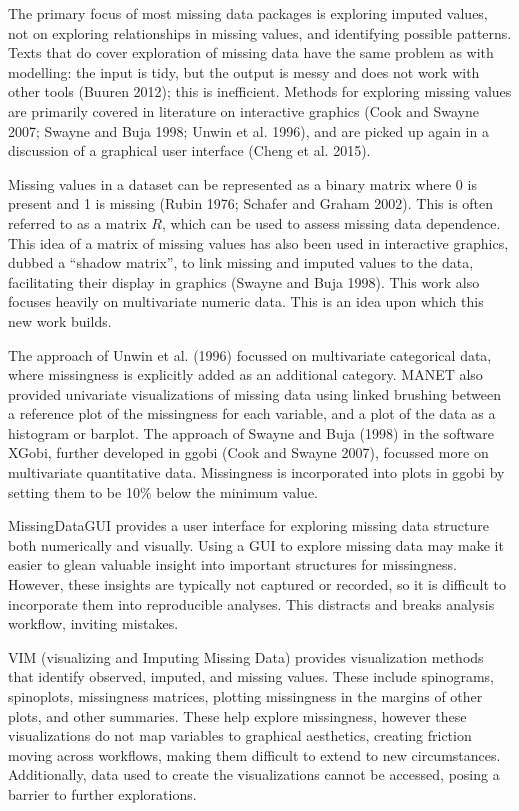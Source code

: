 \documentclass[]{article}
\theoremstyle{definition}
\theoremstyle{definition}
\theoremstyle{definition}
\theoremstyle{remark}
\begin{document}
The primary focus of most missing data packages is exploring imputed
values, not on exploring relationships in missing values, and
identifying possible patterns. Texts that do cover exploration of
missing data have the same problem as with modelling: the input is tidy,
but the output is messy and does not work with other tools (Buuren
2012); this is inefficient. Methods for exploring missing values are
primarily covered in literature on interactive graphics (Cook and Swayne
2007; Swayne and Buja 1998; Unwin et al. 1996), and are picked up again
in a discussion of a graphical user interface (Cheng et al. 2015).

Missing values in a dataset can be represented as a binary matrix where
0 is present and 1 is missing (Rubin 1976; Schafer and Graham 2002).
This is often referred to as a matrix \(R\), which can be used to assess
missing data dependence. This idea of a matrix of missing values has
also been used in interactive graphics, dubbed a ``shadow matrix'', to
link missing and imputed values to the data, facilitating their display
in graphics (Swayne and Buja 1998). This work also focuses heavily on
multivariate numeric data. This is an idea upon which this new work
builds.

The approach of Unwin et al. (1996) focussed on multivariate categorical
data, where missingness is explicitly added as an additional category.
MANET also provided univariate visualizations of missing data using
linked brushing between a reference plot of the missingness for each
variable, and a plot of the data as a histogram or barplot. The approach
of Swayne and Buja (1998) in the software XGobi, further developed in
ggobi (Cook and Swayne 2007), focussed more on multivariate quantitative
data. Missingness is incorporated into plots in ggobi by setting them to
be 10\% below the minimum value.

MissingDataGUI provides a user interface for exploring missing data
structure both numerically and visually. Using a GUI to explore missing
data may make it easier to glean valuable insight into important
structures for missingness. However, these insights are typically not
captured or recorded, so it is difficult to incorporate them into
reproducible analyses. This distracts and breaks analysis workflow,
inviting mistakes.

VIM (visualizing and Imputing Missing Data) provides visualization
methods that identify observed, imputed, and missing values. These
include spinograms, spinoplots, missingness matrices, plotting
missingness in the margins of other plots, and other summaries. These
help explore missingness, however these visualizations do not map
variables to graphical aesthetics, creating friction moving across
workflows, making them difficult to extend to new circumstances.
Additionally, data used to create the visualizations cannot be accessed,
posing a barrier to further explorations.
\end{document}

